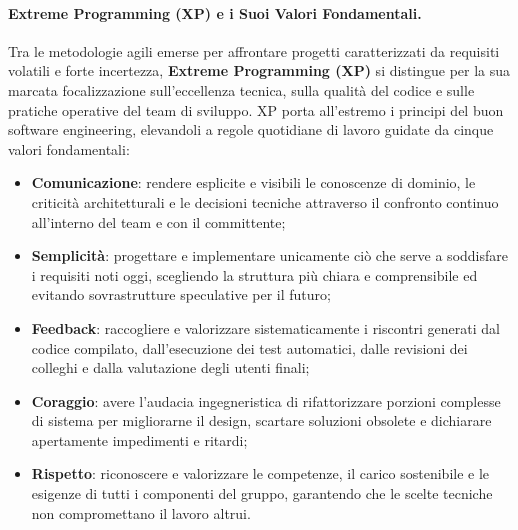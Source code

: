 \documentclass[12pt]{extarticle}
\begin{document}
\paragraph{Extreme Programming (XP) e i Suoi Valori Fondamentali.}
Tra le metodologie agili emerse per affrontare progetti caratterizzati da requisiti volatili e forte incertezza, \textbf{Extreme Programming (XP)} si distingue per la sua marcata focalizzazione sull'eccellenza tecnica, sulla qualità del codice e sulle pratiche operative del team di sviluppo. XP porta all'estremo i principi del buon software engineering, elevandoli a regole quotidiane di lavoro guidate da cinque valori fondamentali:
\begin{itemize}
    \item \textbf{Comunicazione}: rendere esplicite e visibili le conoscenze di dominio, le criticità architetturali e le decisioni tecniche attraverso il confronto continuo all'interno del team e con il committente;
    \item \textbf{Semplicità}: progettare e implementare unicamente ciò che serve a soddisfare i requisiti noti oggi, scegliendo la struttura più chiara e comprensibile ed evitando sovrastrutture speculative per il futuro;
    \item \textbf{Feedback}: raccogliere e valorizzare sistematicamente i riscontri generati dal codice compilato, dall'esecuzione dei test automatici, dalle revisioni dei colleghi e dalla valutazione degli utenti finali;
    \item \textbf{Coraggio}: avere l'audacia ingegneristica di rifattorizzare porzioni complesse di sistema per migliorarne il design, scartare soluzioni obsolete e dichiarare apertamente impedimenti e ritardi;
    \item \textbf{Rispetto}: riconoscere e valorizzare le competenze, il carico sostenibile e le esigenze di tutti i componenti del gruppo, garantendo che le scelte tecniche non compromettano il lavoro altrui.
\end{itemize}
\end{document}
